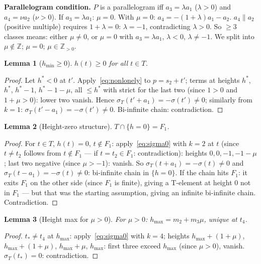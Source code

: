 \documentclass{article}
\newtheorem{lemma}{Lemma}
\begin{document}
\textbf{Parallelogram condition.}
$P$ is a parallelogram iff $a_3=\lambda a_1$ ($\lambda>0$) and $a_4=\nu a_2$ ($\nu>0$).
If $a_3=\lambda a_1$: $\mu=0$.  With $\mu=0$: $a_4=-(1+\lambda)a_1-a_2$.
$a_4\parallel a_2$ (positive multiple) requires $1+\lambda=0$: $\lambda=-1$, contradicting $\lambda>0$.
So $\ge 3$ classes means: either $\mu\ne 0$, or $\mu=0$ with $a_3=\lambda a_1$, $\lambda<0$, $\lambda\ne-1$.
We split into $\mu\notin\mathbb{Z}$; $\mu=0$; $\mu\in\mathbb{Z}_{>0}$.

\begin{lemma}[$h_{\min}\ge 0$]\label{lem:betamin4}
$h(t)\ge 0$ for all $t\in T$.
\end{lemma}
\begin{proof}
Let $h^*<0$ at $t'$.  Apply~\eqref{eq:nonlonely} to $p=s_2+t'$; terms at heights
$h^*$, $h^*$, $h^*-1$, $h^*-1-\mu$, all $\le h^*$ with strict for the last two
(since $1>0$ and $1+\mu>0$): lower two vanish.  Hence $\sigma_T(t'+a_1)=-\sigma(t')\ne 0$;
similarly from $k=1$: $\sigma_T(t'-a_1)=-\sigma(t')\ne 0$.
Bi-infinite chain: contradiction.
\end{proof}

\begin{lemma}[Height-zero structure]\label{lem:hzero}
$T\cap\{h=0\}=F_1$.
\end{lemma}
\begin{proof}
For $t\in T$, $h(t)=0$, $t\notin F_1$: apply~\eqref{eq:sigma0} with $k=2$ at $t$ (since $t\ne t_2$
follows from $t\notin F_1$ — if $t=t_2\in F_1$: contradiction):
heights $0,0,-1,-1-\mu$; last two negative (since $\mu>-1$): vanish.
So $\sigma_T(t+a_1)=-\sigma(t)\ne 0$ and $\sigma_T(t-a_1)=-\sigma(t)\ne 0$:
bi-infinite chain in $\{h=0\}$.  If the chain hits $F_1$: it exits $F_1$ on the other side
(since $F_1$ is finite), giving a T-element at height $0$ not in $F_1$ — but that was the starting assumption, giving an infinite bi-infinite chain.  Contradiction.
\end{proof}

\begin{lemma}[Height max for $\mu>0$]\label{lem:betamax4mu}
For $\mu>0$: $h_{\max}=m_2+m_3\mu$, unique at $t_4$.
\end{lemma}
\begin{proof}
$t_*\ne t_4$ at $h_{\max}$: apply~\eqref{eq:sigma0} with $k=4$;
heights $h_{\max}+(1+\mu)$, $h_{\max}+(1+\mu)$, $h_{\max}+\mu$, $h_{\max}$: first three exceed $h_{\max}$ (since $\mu>0$), vanish.
$\sigma_T(t_*)=0$: contradiction.
\end{proof}
\end{document}
